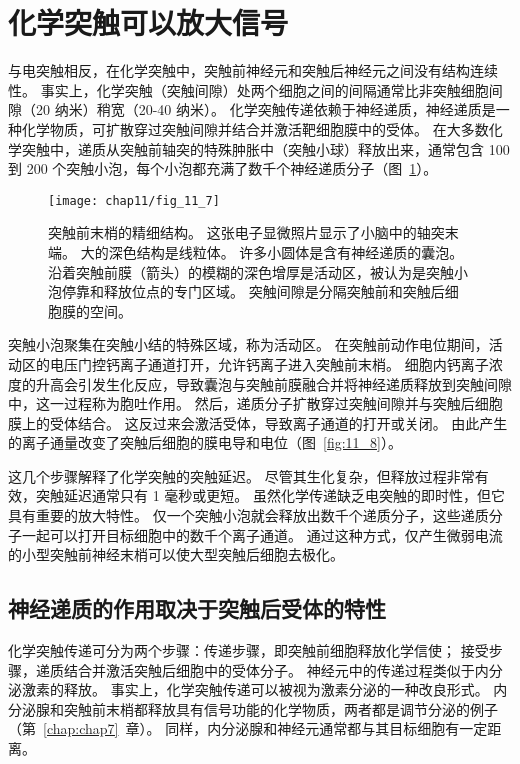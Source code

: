 \section{化学突触可以放大信号}

与电突触相反，在化学突触中，突触前神经元和突触后神经元之间没有结构连续性。
事实上，化学突触（突触间隙）处两个细胞之间的间隔通常比非突触细胞间隙（20 纳米）稍宽（20-40 纳米）。
化学突触传递依赖于神经递质，神经递质是一种化学物质，可扩散穿过突触间隙并结合并激活靶细胞膜中的受体。
在大多数化学突触中，递质从突触前轴突的特殊肿胀中（突触小球）释放出来，通常包含 100 到 200 个突触小泡，每个小泡都充满了数千个神经递质分子（图~\ref{fig:11_7}）。


\begin{figure}[htbp]
	\centering
	\texttt{[image: chap11/fig\_11\_7]}
	\caption{突触前末梢的精细结构。
		这张电子显微照片显示了小脑中的轴突末端。
		大的深色结构是线粒体。
		许多小圆体是含有神经递质的囊泡。
		沿着突触前膜（箭头）的模糊的深色增厚是活动区，被认为是突触小泡停靠和释放位点的专门区域。
		突触间隙是分隔突触前和突触后细胞膜的空间。}
	\label{fig:11_7}
\end{figure}


突触小泡聚集在突触小结的特殊区域，称为活动区。
在突触前动作电位期间，活动区的电压门控钙离子通道打开，允许钙离子进入突触前末梢。
细胞内钙离子浓度的升高会引发生化反应，导致囊泡与突触前膜融合并将神经递质释放到突触间隙中，这一过程称为胞吐作用。
然后，递质分子扩散穿过突触间隙并与突触后细胞膜上的受体结合。
这反过来会激活受体，导致离子通道的打开或关闭。
由此产生的离子通量改变了突触后细胞的膜电导和电位（图~\ref{fig:11_8}）。


这几个步骤解释了化学突触的突触延迟。
尽管其生化复杂，但释放过程非常有效，突触延迟通常只有 1 毫秒或更短。
虽然化学传递缺乏电突触的即时性，但它具有重要的放大特性。
仅一个突触小泡就会释放出数千个递质分子，这些递质分子一起可以打开目标细胞中的数千个离子通道。
通过这种方式，仅产生微弱电流的小型突触前神经末梢可以使大型突触后细胞去极化。



\subsection{神经递质的作用取决于突触后受体的特性}

化学突触传递可分为两个步骤：传递步骤，即突触前细胞释放化学信使；
接受步骤，递质结合并激活突触后细胞中的受体分子。
神经元中的传递过程类似于内分泌激素的释放。
事实上，化学突触传递可以被视为激素分泌的一种改良形式。
内分泌腺和突触前末梢都释放具有信号功能的化学物质，两者都是调节分泌的例子（第~\ref{chap:chap7}~章）。
同样，内分泌腺和神经元通常都与其目标细胞有一定距离。



